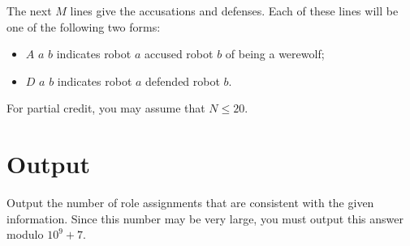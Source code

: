 The next $M$ lines give the accusations and defenses. Each of these lines will be one of the following two forms:

\begin{itemize}
\item $A$ $a$ $b$ indicates robot $a$ accused robot $b$ of being a werewolf;
\item $D$ $a$ $b$ indicates robot $a$ defended robot $b$.
\end{itemize}

For partial credit, you may assume that $N \leq 20$.

\section*{Output}
Output the number of role assignments that are consistent with the given information. Since this number may be very large, you must output this answer modulo $10^9 + 7$.
